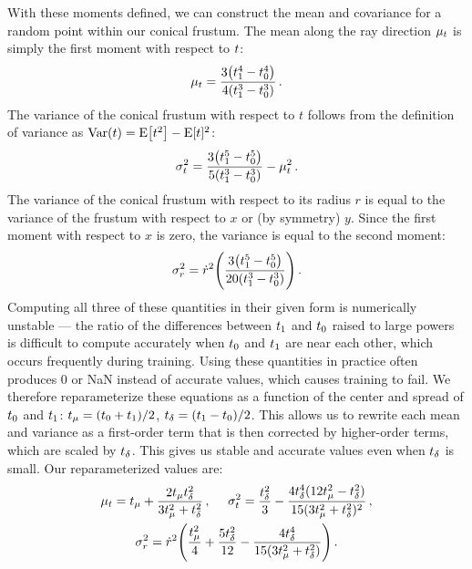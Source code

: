 \documentclass[10pt,twocolumn,letterpaper]{article}
\begin{document}
With these moments defined, we can construct the mean and covariance for a random point within our conical frustum. The mean along the ray direction $\mu_t$ is simply the first moment with respect to $t$:
\begin{equation}
\mu_\zval = \frac{3\left(\zval_1^4-\zval_0^4\right)}{4\left(\zval_1^3-\zval_0^3\right)}\, .
\end{equation}
The variance of the conical frustum with respect to $t$ follows from the definition of variance as $\operatorname{Var}(\zval)=\operatorname{E} \left[\zval^{2}\right]-\operatorname{E}[\zval]^{2}$:
\begin{equation}
    \sigma_\zval^2 = \frac{3 \left(\zval_1^5 - \zval_0^5\right)}{5 \left( \zval_1^3 - \zval_0^3\right)} - \mu_\zval^2\,.
\end{equation}
The variance of the conical frustum with respect to its radius $r$ is equal to the variance of the frustum with respect to $x$ or (by symmetry) $y$. Since the first moment with respect to $x$ is zero, the variance is equal to the second moment:
\begin{equation}
    \sigma_{r}^2 = \baseradius^2 \left(\frac{3 \left( \zval_1^5 - \zval_0^5 \right)}{20 \left(\zval_1^3 - \zval_0^3\right)}\right)\,.
\end{equation}
Computing all three of these quantities in their given form is numerically unstable --- the ratio of the differences between $t_1$ and $t_0$ raised to large powers is difficult to compute accurately when $t_0$ and $t_1$ are near each other, which occurs frequently during training. Using these quantities in practice often produces 0 or NaN instead of accurate values, which causes training to fail.
We therefore reparameterize these equations as a function of the center and spread of $t_0$ and $t_1$: $t_\mu = (t_0 + t_1) / 2$, $t_\delta = (t_1 - t_0) / 2$.
This allows us to rewrite each mean and variance as a first-order term that is then corrected by higher-order terms, which are scaled by $t_\delta$. This gives us stable and accurate values even when $t_\delta$ is small. Our reparameterized values are:
\begin{gather}
    \mu_\zval = \zc + \frac{2 \zc \zd^2}{3 \zc^2 + \zd^2}\,,  \quad\,\,
    \sigma_\zval^2 = \frac{\zd^2}{3} -\frac{4 \zd^4 (12 \zc^2 - \zd^2)}{15 (3 \zc^2 + \zd^2)^2}\,, \nonumber \\
    \sigma_{r}^2 = \baseradius^2 \left( \frac{\zc^2}{4} + \frac{5 \zd^2}{12} - \frac{4 \zd^4}{15 (3 \zc^2 + \zd^2)} \right) \,.
\end{gather}
\end{document}
